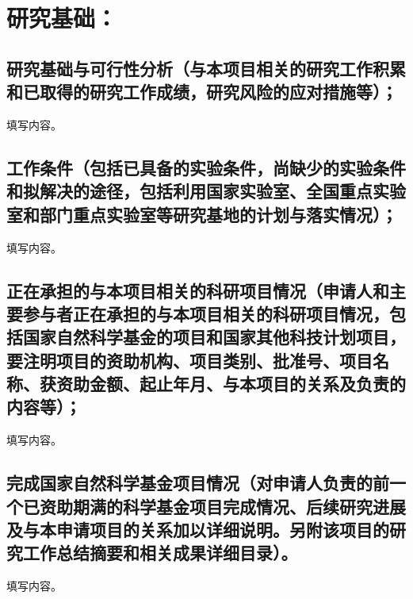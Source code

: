 \par
\chapter{\textbf{研究基础：}}

\section{\textbf{研究基础与可行性分析}（与本项目相关的研究工作积累和已取得的研究工作成绩，研究风险的应对措施等）；}
填写内容。

\section{\textbf{工作条件}（包括已具备的实验条件，尚缺少的实验条件和拟解决的途径，包括利用国家实验室、全国重点实验室和部门重点实验室等研究基地的计划与落实情况）；}
填写内容。

\section{\textbf{正在承担的与本项目相关的科研项目情况}（申请人和主要参与者正在承担的与本项目相关的科研项目情况，包括国家自然科学基金的项目和国家其他科技计划项目，要注明项目的资助机构、项目类别、批准号、项目名称、获资助金额、起止年月、与本项目的关系及负责的内容等）；}
填写内容。

\section{\textbf{完成国家自然科学基金项目情况}（对申请人负责的前一个已资助期满的科学基金项目完成情况、后续研究进展及与本申请项目的关系加以详细说明。另附该项目的研究工作总结摘要和相关成果详细目录）。}
填写内容。
